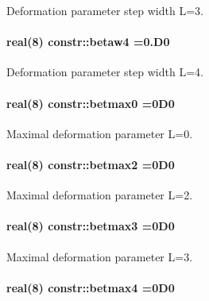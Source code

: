 Deformation parameter step width L=3. 

\paragraph[{\texorpdfstring{betaw4}{betaw4}}]{\setlength{\rightskip}{0pt plus 5cm}real(8) constr\+::betaw4 =0.\+D0}\hypertarget{namespaceconstr_a714dc0ad37c80c778012223401f2f890}{}\label{namespaceconstr_a714dc0ad37c80c778012223401f2f890}


Deformation parameter step width L=4. 

\paragraph[{\texorpdfstring{betmax0}{betmax0}}]{\setlength{\rightskip}{0pt plus 5cm}real(8) constr\+::betmax0 =0\+D0}\hypertarget{namespaceconstr_a7fbe5760b32df936a8089956632bff62}{}\label{namespaceconstr_a7fbe5760b32df936a8089956632bff62}


Maximal deformation parameter L=0. 

\paragraph[{\texorpdfstring{betmax2}{betmax2}}]{\setlength{\rightskip}{0pt plus 5cm}real(8) constr\+::betmax2 =0\+D0}\hypertarget{namespaceconstr_aa1746615301e6c7db864892b4a4efcae}{}\label{namespaceconstr_aa1746615301e6c7db864892b4a4efcae}


Maximal deformation parameter L=2. 

\paragraph[{\texorpdfstring{betmax3}{betmax3}}]{\setlength{\rightskip}{0pt plus 5cm}real(8) constr\+::betmax3 =0\+D0}\hypertarget{namespaceconstr_abb4b139e7e590c9745b1c81dc1f2ea63}{}\label{namespaceconstr_abb4b139e7e590c9745b1c81dc1f2ea63}


Maximal deformation parameter L=3. 

\paragraph[{\texorpdfstring{betmax4}{betmax4}}]{\setlength{\rightskip}{0pt plus 5cm}real(8) constr\+::betmax4 =0\+D0}\hypertarget{namespaceconstr_a97294754aa9f8b191ccfc286e1368c33}{}\label{namespaceconstr_a97294754aa9f8b191ccfc286e1368c33}


